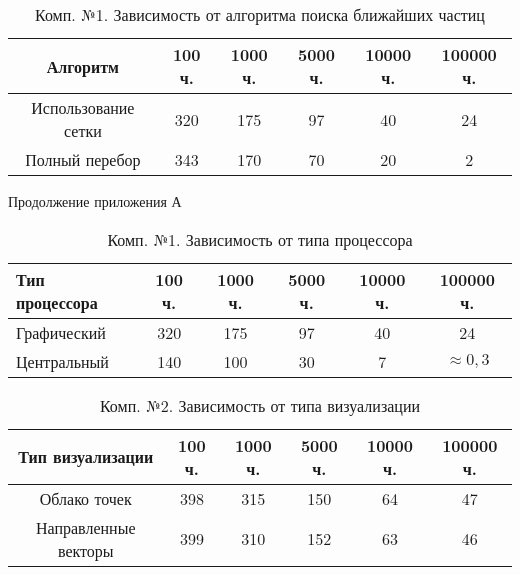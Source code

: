 \begin{table}[h!]
  \captionsetup{width=0.9\textwidth}
  \caption{\label{tab:fst:algorithm}Комп. №1. Зависимость от алгоритма поиска ближайших частиц}
  \begin{center}
    \begin{tabular}{|c|c|c|c|c|c|}
      \hline
      Алгоритм & 100 ч. & 1000 ч. & 5000 ч. & 10000 ч. & 100000 ч. \\
      \hline
      Использование сетки & 320 & 175 & 97 & 40 & 24 \\
      Полный перебор & 343 & 170 & 70 & 20 & 2 \\
      \hline
    \end{tabular}
  \end{center}
\end{table}

\newpage
\begin{flushright}
  Продолжение приложения А
\end{flushright}

\begin{table}[h!] 
  \captionsetup{width=0.85\textwidth}
  \caption{\label{tab:fst:cpu}Комп. №1. Зависимость от типа процессора} 
  \begin{center} 
    \begin{tabular}{|l|c|c|c|c|c|} 
      \hline
      Тип процессора & 100 ч. & 1000 ч. & 5000 ч. & 10000 ч. & 100000 ч. \\
      \hline
      Графический & 320 & 175 & 97 & 40 & 24 \\
      Центральный & 140 & 100 & 30 & 7 & $\approx{}0,3$ \\
      \hline
    \end{tabular} 
  \end{center} 
\end{table} 

\begin{table}[h!] 
  \captionsetup{width=0.9\textwidth}
  \caption{\label{tab:snd:simple}Комп. №2. Зависимость от типа визуализации} 
  \begin{center}
    \begin{tabular}{|c|c|c|c|c|c|}
      \hline
      Тип визуализации & 100 ч. & 1000 ч. & 5000 ч. & 10000 ч. & 100000 ч. \\
      \hline
      Облако точек & 398 & 315 & 150 & 64 & 47 \\
      Направленные векторы & 399 & 310 & 152 & 63 & 46 \\
      \hline
    \end{tabular}
  \end{center}
\end{table}

